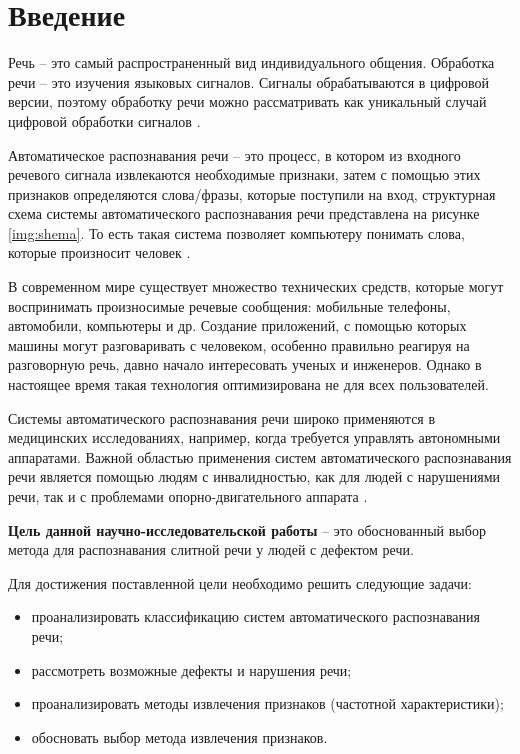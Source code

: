 \chapter*{Введение}
\setcounter{page}{2}

Речь -- это самый распространенный вид индивидуального общения. Обработка речи -- это изучения языковых сигналов. Сигналы обрабатываются в цифровой версии, поэтому обработку речи можно рассматривать как уникальный случай цифровой обработки сигналов \cite{vvegenie}.

Автоматическое распознавания речи -- это процесс, в котором из входного речевого сигнала извлекаются необходимые признаки, затем с помощью этих признаков определяются слова/фразы, которые поступили на вход,  структурная схема системы автоматического распознавания речи представлена на рисунке \ref{img:shema}. То есть такая система позволяет компьютеру понимать слова, которые произносит человек \cite{vvegenie2}.


В современном мире существует множество технических средств, которые могут воспринимать произносимые речевые сообщения: мобильные телефоны, автомобили, компьютеры и др. Создание приложений, с помощью которых машины могут разговаривать с человеком, особенно правильно реагируя на разговорную речь, давно начало интересовать ученых и инженеров. Однако в настоящее время такая технология оптимизирована не для всех пользователей.

Системы автоматического распознавания речи широко применяются в медицинских исследованиях, например, когда требуется управлять автономными аппаратами. Важной областью применения систем автоматического распознавания речи является помощью людям с инвалидностью, как для людей с нарушениями речи, так и с проблемами опорно-двигательного аппарата \cite{vvegenie3}.

\textbf{Цель данной научно-исследовательской работы} -- это обоснованный выбор метода для распознавания слитной речи у людей с дефектом речи.

Для достижения поставленной цели необходимо решить следующие задачи:
\begin{itemize}
	\item проанализировать классификацию систем автоматического распознавания речи;
	\item рассмотреть возможные дефекты и нарушения речи;
	\item проанализировать методы извлечения признаков (частотной характеристики);
	\item обосновать выбор метода извлечения признаков.
\end{itemize}


